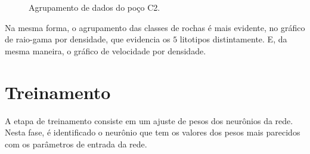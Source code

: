 \begin{figure}[H]
	\centering
	\setlength{\fboxsep}{8pt}
	\setlength{\fboxrule}{0.1pt}
	\caption{Agrupamento de dados do poço C2.}
	\label{clusterC2}
\end{figure} 

Na mesma forma, o agrupamento das classes de rochas é mais evidente, no gráfico de raio-gama por densidade, que evidencia os $5$ litotipos distintamente. E, da mesma maneira, o gráfico de velocidade por densidade.

\section{Treinamento}

A etapa de treinamento consiste em um ajuste de pesos dos neurônios da rede. Nesta fase, é identificado o neurônio que tem os valores dos pesos mais parecidos com os parâmetros de entrada da rede.  

